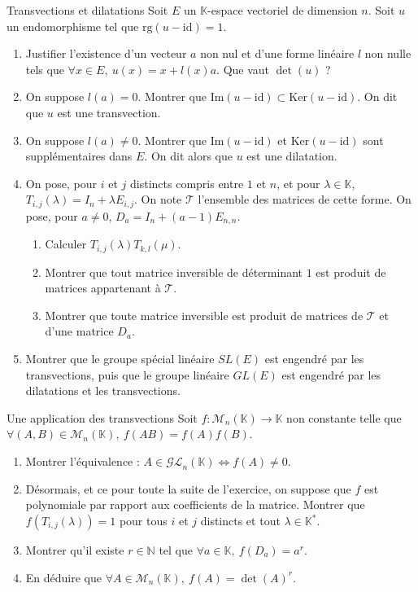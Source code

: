 \documentclass[french,a4paper]{article}
\newcommand{\N}{\mathbb{N}}
\newcommand{\K}{\mathbb{K}}
\newcommand{\st}{^*}
\renewcommand{\ker}{\text{Ker}}
\newcommand{\im}{\text{Im}}
\theoremstyle{plain}
\theoremstyle{definition}
\theoremstyle{remark}
\begin{document}
\begin{ex}{Transvections et dilatations}
	Soit $E$ un $\K$-espace vectoriel de dimension $n$. Soit $u$ un endomorphisme tel que $\text{rg}(u-\text{id})=1$.
	\begin{enumerate}
		\item Justifier l'existence d'un vecteur $a$ non nul et d'une forme linéaire $l$ non nulle tels que $\forall x\in E,\ u(x)=x+l(x)a$. Que vaut $\det(u)$ ?
		\item On suppose $l(a)=0$. Montrer que $\im(u-\text{id})\subset\ker(u-\text{id})$. On dit que $u$ est une transvection.
		\item On suppose $l(a)\ne 0$. Montrer que $\im(u-\text{id})$ et $\ker(u-\text{id})$ sont supplémentaires dans $E$. On dit alors que $u$ est une dilatation.
		\item On pose, pour $i$ et $j$ distincts compris entre $1$ et $n$, et pour $\lambda\in\K$, $T_{i,j}(\lambda)=I_n+\lambda E_{i,j}$. On note $\mathcal{T}$ l'ensemble des matrices de cette forme. On pose, pour $a\ne 0$, $D_a=I_n+(a-1)E_{n,n}$.
		\begin{enumerate}[label=\alph*.]
			\item Calculer $T_{i,j}(\lambda)T_{k,l}(\mu)$.
			\item Montrer que tout matrice inversible de déterminant $1$ est produit de matrices appartenant à $\mathcal{T}$.
			\item Montrer que toute matrice inversible est produit de matrices de $\mathcal{T}$ et d'une matrice $D_a$.
		\end{enumerate}
		\item Montrer que le groupe spécial linéaire $SL(E)$ est engendré par les transvections, puis que le groupe linéaire $GL(E)$ est engendré par les dilatations et les transvections.
	\end{enumerate}
\end{ex}
\begin{ex}{Une application des transvections}
	Soit $f:\mathcal{M}_n(\K)\to\K$ non constante telle que $\forall(A,B)\in\mathcal{M}_n(\K),\ f(AB)=f(A)f(B)$.
	\begin{enumerate}
		\item Montrer l'équivalence : $A\in\mathcal{GL}_n(\K)\iff f(A)\ne 0$.
		\item Désormais, et ce pour toute la suite de l'exercice, on suppose que $f$ est polynomiale par rapport aux coefficients de la matrice. Montrer que $f(T_{i,j}(\lambda))=1$ pour tous $i$ et $j$ distincts et tout $\lambda\in\K\st$.
		\item Montrer qu'il existe $r\in\N$ tel que $\forall a\in\K,\ f(D_a)=a^r$.
		\item En déduire que $\forall A\in\mathcal{M}_n(\K),\ f(A)=\det(A)^r$.
	\end{enumerate}
\end{ex}
\end{document}
